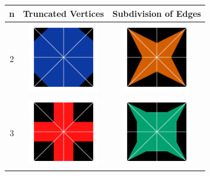 \documentclass{beamer}
\begin{document}
\begin{frame}
\begin{table}
\centering
\begin{tabular}{c|c|c}
n & Truncated Vertices & Subdivision of Edges\\\hline
2 &\includegraphics[width=3cm]{8tv}&\includegraphics[width=3cm]{8se} \\\hline
3 & \includegraphics[width=3cm]{12tv} &\includegraphics[width=3cm]{12se}\\\hline
\end{tabular}
\end{table}
\end{frame}
\end{document}
